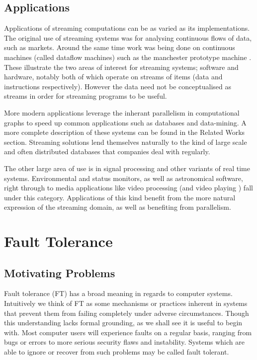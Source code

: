 \subsection{Applications}

Applications of streaming computations can be as varied as its implementations.
The original use of streaming systems was for analysing continuous flows of data, such as markets.
Around the same time work was being done on continuous machines (called dataflow machines) such as the manchester prototype machine \cite{gur85}.
These illustrate the two areas of interest for streaming systems; software and hardware, notably both of which operate on streams of items (data and instructions respectively).
However the data need not be conceptualised as streams in order for streaming programs to be useful.

More modern applications leverage the inherant parallelism in computational graphs to speed up common applications such as databases and data-mining.
A more complete description of these systems can be found in the Related Works section.
Streaming solutions lend themselves naturally to the kind of large scale and often distributed databases that companies deal with regularly.

The other large area of use is in signal processing and other variants of real time systems.
Environmental and status monitors, as well as astronomical software, right through to media applications like video processing (and video playing \cite{thies02}) fall under this category.
Applications of this kind benefit from the more natural expression of the streaming domain, as well as benefiting from parallelism.

\section{Fault Tolerance}
\subsection{Motivating Problems}
Fault tolerance (FT) has a broad meaning in regards to computer systems.
Intuitively we think of FT as some mechanisms or practices inherent in systems that prevent them from failing completely under adverse circumstances.
Though this understanding lacks formal grounding, as we shall see it is useful to begin with.
Most computer users will experience faults on a regular basis, ranging from bugs or errors to more serious security flaws and instability.
Systems which are able to ignore or recover from such problems may be called fault tolerant.

